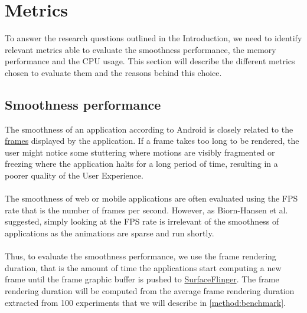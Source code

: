 \documentclass{kththesis}
\begin{document}
\section{Metrics}

To answer the research questions outlined in the Introduction, we need to identify relevant metrics able to evaluate the smoothness performance, the memory performance and the CPU usage. This section will describe the different metrics chosen to evaluate them and the reasons behind this choice. 

\subsection{Smoothness performance}

The smoothness of an application according to Android is closely related to the \hyperref[def:frame]{frames} displayed by the application. If a frame takes too long to be rendered, the user might notice some stuttering where motions are visibly fragmented or freezing where the application halts for a long period of time, resulting in a poorer quality of the User Experience.

\paragraph{}
The smoothness of web or mobile applications are often evaluated using the FPS rate that is the number of frames per second. However, as Biorn-Hansen et al. suggested\cite{animation_performance}, simply looking at the FPS rate is irrelevant of the smoothness of applications as the animations are sparse and run shortly. 

\paragraph{}
Thus, to evaluate the smoothness performance, we use the frame rendering duration, that is the amount of time the applications start computing a new frame until the frame graphic buffer is pushed to \hyperref[def:surfaceflinger]{SurfaceFlinger}. The frame rendering duration will be computed from the average frame rendering duration extracted from 100 experiments that we will describe in \autoref{method:benchmark}. 


%
\end{document}
